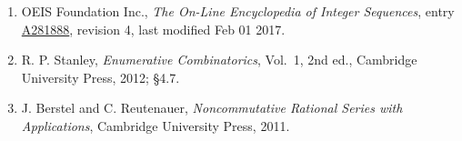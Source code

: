 \documentclass[11pt]{article}
\theoremstyle{definition}
\begin{document}
\begin{enumerate}

\item OEIS Foundation Inc., \emph{The On-Line Encyclopedia of Integer Sequences}, entry \href{https://oeis.org/A281888}{A281888}, revision 4, last modified Feb 01 2017.

\item R. P. Stanley, \emph{Enumerative Combinatorics}, Vol.~1, 2nd ed., Cambridge University Press, 2012; \S4.7.

\item J. Berstel and C. Reutenauer, \emph{Noncommutative Rational Series with Applications}, Cambridge University Press, 2011.

\end{enumerate}
\end{document}
